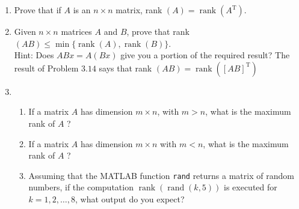 \documentclass[../main.tex]{subfiles}
\begin{document}
\begin{enumerate}[label=\textbf{3.\arabic*}, noitemsep]
\item Prove that if $A$ is an $n \times n$ matrix, rank $(A)=\operatorname{rank}\left(A^{\mathrm{T}}\right)$.

\item Given $n \times n$ matrices $A$ and $B$, prove that rank $(A B) \leq \min \{\operatorname{rank}(A), \operatorname{rank}(B)\}$. \\
Hint: Does $A B x=A(B x)$ give you a portion of the required result? The result of Problem $3.14$ says that rank $(A B)=\operatorname{rank}\left([A B]^{\mathrm{T}}\right)$

\item
	\begin{enumerate}[label=\textbf{\alph*. }, noitemsep]
	\item If a matrix $A$ has dimension $m \times n$, with $m>n$, what is the maximum rank of $A$ ?
	\item If a matrix $A$ has dimension $m \times n$ with $m<n$, what is the maximum rank of $A$ ?
	\item Assuming that the MATLAB function \texttt{rand} returns a matrix of random numbers, if the computation
	$\operatorname{rank}(\operatorname{rand}(k, 5))$
	is executed for $k=1,2, \ldots, 8$, what output do you expect?
	\end{enumerate}
\end{enumerate}
\end{document}
